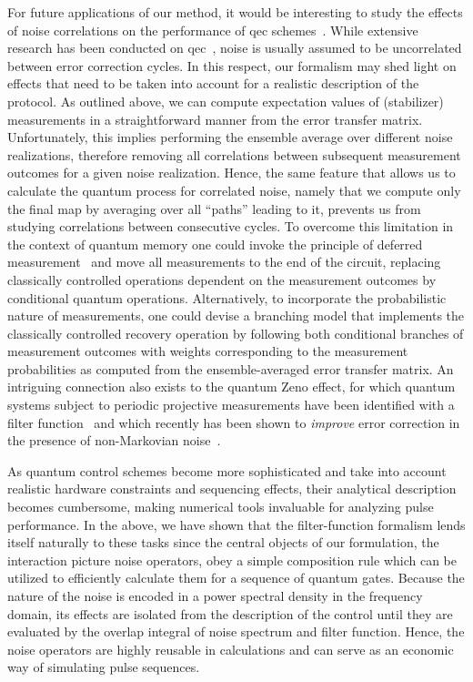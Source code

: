 For future applications of our method, it would be interesting to study the effects of noise correlations on the performance of \gls{qec} schemes~\cite{Devitt2013,Ng2011,Nickerson2019,Clader2021,Liu2024b}.
While extensive research has been conducted on \gls{qec}~\cite{Terhal2015}, noise is usually assumed to be uncorrelated between error correction cycles.
In this respect, our formalism may shed light on effects that need to be taken into account for a realistic description of the protocol.
As outlined above, we can compute expectation values of (stabilizer) measurements in a straightforward manner from the error transfer matrix.
Unfortunately, this implies performing the ensemble average over different noise realizations, therefore removing all correlations between subsequent measurement outcomes for a given noise realization.
Hence, the same feature that allows us to calculate the quantum process for correlated noise, namely that we compute only the final map by averaging over all \enquote{paths} leading to it, prevents us from studying correlations between consecutive cycles.
To overcome this limitation in the context of quantum memory one could invoke the principle of deferred measurement~\cite{Nielsen2011} and move all measurements to the end of the circuit, replacing classically controlled operations dependent on the measurement outcomes by conditional quantum operations.
Alternatively, to incorporate the probabilistic nature of measurements, one could devise a branching model that implements the classically controlled recovery operation by following both conditional branches of measurement outcomes with weights corresponding to the measurement probabilities as computed from the ensemble-averaged error transfer matrix.
An intriguing connection also exists to the quantum Zeno effect, for which quantum systems subject to periodic projective measurements have been identified with a filter function~\cite{Kofman2000,Kofman2001,Chaudhry2016} and which recently has been shown to \emph{improve} error correction in the presence of non-Markovian noise~\cite{Nila2025}.

As quantum control schemes become more sophisticated and take into account realistic hardware constraints and sequencing effects, their analytical description becomes cumbersome, making numerical tools invaluable for analyzing pulse performance.
In the above, we have shown that the filter-function formalism lends itself naturally to these tasks since the central objects of our formulation, the interaction picture noise operators, obey a simple composition rule which can be utilized to efficiently calculate them for a sequence of quantum gates.
Because the nature of the noise is encoded in a power spectral density in the frequency domain, its effects are isolated from the description of the control until they are evaluated by the overlap integral of noise spectrum and filter function.
Hence, the noise operators are highly reusable in calculations and can serve as an economic way of simulating pulse sequences.

